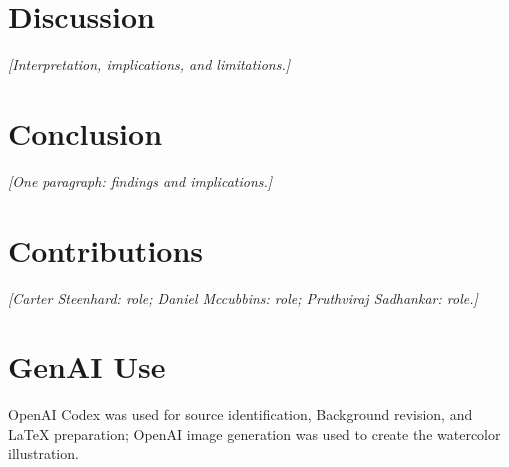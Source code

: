 \documentclass[sigconf,nonacm]{acmart}
\newcommand{\placeholder}[1]{\textit{[#1]}}
\newif\ifdraftspacing
\newcommand{\draftspace}[1]{\ifdraftspacing\par\vspace*{#1}\fi}
\newcommand{\draftpage}{\ifdraftspacing\clearpage\fi}
\begin{document}
\section{Discussion}
\label{sec:discussion}
\placeholder{Interpretation, implications, and limitations.}
\draftspace{120mm}
\draftpage

\section{Conclusion}
\label{sec:conclusion}
\placeholder{One paragraph: findings and implications.}
\draftspace{40mm}

\section{Contributions}
\placeholder{Carter Steenhard: role; Daniel Mccubbins: role; Pruthviraj Sadhankar: role.}
\draftspace{40mm}

\section{GenAI Use}
OpenAI Codex was used for source identification, Background revision, and LaTeX preparation; OpenAI image generation was used to create the watercolor illustration.
\draftspace{20mm}
\draftpage



\end{document}
